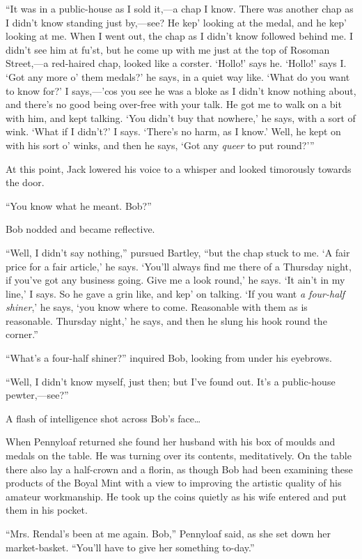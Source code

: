 ``It was in a public-house as I sold it,---a chap I know. There was
another chap as I didn't know standing just by,---see? He kep' looking
at the medal, and he kep' looking at me. When I went out, the chap as I
didn't know followed behind me. I didn't see him at fu'st, but he come
up with me just at the top of Rosoman Street,---a red-haired chap,
looked like a corster. `Hollo!' says he. `Hollo!' says I. `Got any more
o' them {}medals?' he says, in a quiet way like. `What do you want to
know for?' I says,---'cos you see he was a bloke as I didn't know
nothing about, and there's no good being over-free with your talk. He
got me to walk on a bit with him, and kept talking. `You didn't buy that
nowhere,' he says, with a sort of wink. `What if I didn't?' I says.
`There's no harm, as I know.' Well, he kept on with his sort o' winks,
and then he says, `Got any \emph{queer} to put round?'''

At this point, Jack lowered his voice to a whisper and looked timorously
towards the door.

``You know what he meant. Bob?''

Bob nodded and became reflective.

``Well, I didn't say nothing,'' pursued Bartley, ``but the chap stuck to
me. `A fair price for a fair article,' he says. `You'll always find me
there of a Thursday night, if you've got any business going. Give me a
look round,' he says. `It ain't in my line,' I says. So he gave a grin
like, and kep' on talking. `If you want \emph{a four-half shiner},' he
says, `you {}know where to come. Reasonable with them as is reasonable.
Thursday night,' he says, and then he slung his hook round the corner.''

``What's a four-half shiner?'' inquired Bob, looking from under his
eyebrows.

``Well, I didn't know myself, just then; but I've found out. It's a
public-house pewter,---see?''

A flash of intelligence shot across Bob's face\ldots{}

When Pennyloaf returned she found her husband with his box of moulds and
medals on the table. He was turning over its contents, meditatively. On
the table there also lay a half-crown and a florin, as though Bob had
been examining these products of the Boyal Mint with a view to improving
the artistic quality of his amateur workmanship. He took up the coins
quietly as his wife entered and put them in his pocket.

``Mrs. Rendal's been at me again. Bob,'' Pennyloaf said, as she set down
her market-basket. ``You'll have to give her something to-day.''

